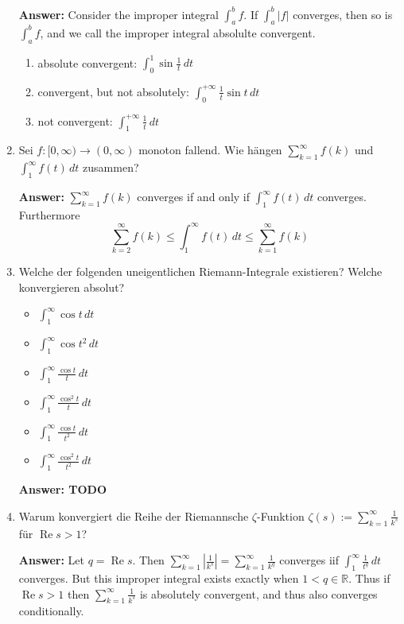 \documentclass[11pt]{article}
\newcommand{\abs}[1]{\left|#1\right|}
\newcommand{\RR}[0]{\mathbb{R}}
\renewcommand{\Re}[0]{\operatorname{Re}}
\begin{document}
\begin{enumerate}
    \textbf{Answer:} Consider the improper integral $\int_a^b f$. If $\int_a^b\abs{f}$ converges, then so is $\int_a^b f$, and we call the improper integral absolulte convergent.

    \begin{enumerate}
        \item absolute convergent: $\int_0^1 \sin{\frac{1}{t}}\,dt$
        \item convergent, but not absolutely: $\int_0^{+\infty}\frac{1}{t}\sin{t}\,dt$
        \item not convergent: $\int_1^{+\infty} \frac{1}{t}\,dt$
    \end{enumerate}


    \item Sei $f: [0, \infty) \to (0, \infty)$ monoton fallend. Wie hängen $\sum_{k=1}^\infty f(k)$ und $\int_1^\infty f(t)\,dt$ zusammen?

    \textbf{Answer:} $\sum_{k=1}^\infty f(k)$ converges if and only if $\int_1^\infty f(t)\,dt$ converges. Furthermore  $$\sum_{k=2}^\infty f(k) \le \int_1^\infty f(t)\,dt \le \sum_{k=1}^\infty f(k)$$
    \item Welche der folgenden uneigentlichen Riemann-Integrale existieren? Welche konvergieren absolut?
    \begin{itemize}
        \item $\int_1^\infty \cos{t}\,dt$
        \item $\int_1^\infty \cos{t^2}\,dt$
        \item $\int_1^\infty \frac{\cos{t}}{t} \,dt$
        \item $\int_1^\infty \frac{\cos^2{t}}{t} \,dt$
        \item $\int_1^\infty \frac{\cos{t}}{t^2} \,dt$
        \item $\int_1^\infty \frac{\cos^2{t}}{t^2} \,dt$
    \end{itemize}

    \textbf{Answer: TODO}
    \item Warum konvergiert die Reihe der Riemannsche $\zeta$-Funktion $\zeta(s) := \sum_{k=1}^\infty \frac{1}{k^s}$ für $\Re{s} > 1$?

    \textbf{Answer:} Let $q = \Re{s}$. Then $\sum_{k=1}^\infty \abs{\frac{1}{k^s}} = \sum_{k=1}^\infty \frac{1}{k^q}$ converges iif $\int_1^\infty \frac{1}{t^q}\,dt$ converges. But this improper integral exists exactly when $1 < q \in \RR$. Thus if $\Re{s} > 1$ then $\sum_{k=1}^\infty \frac{1}{k^s}$ is absolutely convergent, and thus also converges conditionally.


\end{enumerate}
\end{document}
